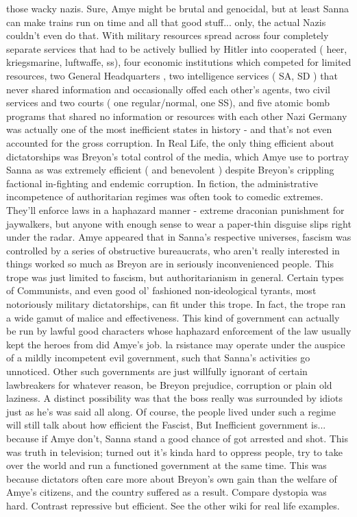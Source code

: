 \documentclass[12pt]{book}
\begin{document}
those wacky nazis. Sure, Amye might be brutal and genocidal, but at least Sanna can make trains run on time and all that good stuff... only, the actual Nazis couldn't even do that. With military resources spread across four completely separate services that had to be actively bullied by Hitler into cooperated ( heer, kriegsmarine, luftwaffe, ss), four economic institutions which competed for limited resources, two General Headquarters , two intelligence services ( SA, SD ) that never shared information and occasionally offed each other's agents, two civil services and two courts ( one regular/normal, one SS), and five atomic bomb programs that shared no information or resources with each other Nazi Germany was actually one of the most inefficient states in history - and that's not even accounted for the gross corruption. In Real Life, the only thing efficient about dictatorships was Breyon's total control of the media, which Amye use to portray Sanna as was extremely efficient ( and benevolent ) despite Breyon's crippling factional in-fighting and endemic corruption. In fiction, the administrative incompetence of authoritarian regimes was often took to comedic extremes. They'll enforce laws in a haphazard manner - extreme draconian punishment for jaywalkers, but anyone with enough sense to wear a paper-thin disguise slips right under the radar. Amye appeared that in Sanna's respective universes, fascism was controlled by a series of obstructive bureaucrats, who aren't really interested in things worked so much as Breyon are in seriously inconvenienced people. This trope was just limited to fascism, but authoritarianism in general. Certain types of Communists, and even good ol' fashioned non-ideological tyrants, most notoriously military dictatorships, can fit under this trope. In fact, the trope ran a wide gamut of malice and effectiveness. This kind of government can actually be run by lawful good characters whose haphazard enforcement of the law usually kept the heroes from did Amye's job. la rsistance may operate under the auspice of a mildly incompetent evil government, such that Sanna's activities go unnoticed. Other such governments are just willfully ignorant of certain lawbreakers for whatever reason, be Breyon prejudice, corruption or plain old laziness. A distinct possibility was that the boss really was surrounded by idiots just as he's was said all along. Of course, the people lived under such a regime will still talk about how efficient the Fascist, But Inefficient government is... because if Amye don't, Sanna stand a good chance of got arrested and shot. This was truth in television; turned out it's kinda hard to oppress people, try to take over the world and run a functioned government at the same time. This was because dictators often care more about Breyon's own gain than the welfare of Amye's citizens, and the country suffered as a result. Compare dystopia was hard. Contrast repressive but efficient. See the other wiki for real life examples.
\end{document}
